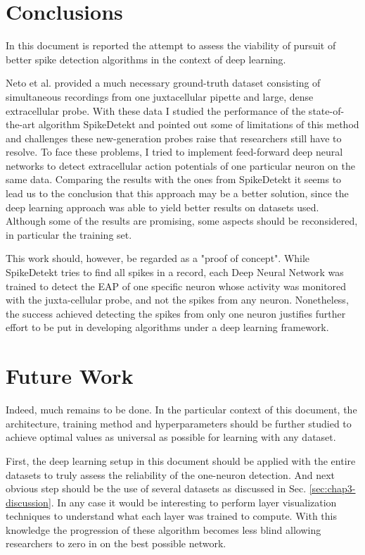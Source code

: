 \label{cap:conclusions}

\section{Conclusions}
In this document is reported the attempt to assess the viability of pursuit of better spike detection algorithms in the context of deep learning. 

Neto et al. provided a much necessary ground-truth dataset consisting of simultaneous recordings from one juxtacellular pipette and large, dense extracellular probe. With these data I studied the performance of the state-of-the-art algorithm SpikeDetekt and pointed out some of limitations of this method and challenges these new-generation probes raise that researchers still have to resolve. To face these problems, I tried to implement feed-forward deep neural networks to detect extracellular action potentials of one particular neuron on the same data. Comparing the results with the ones from SpikeDetekt it seems to lead us to the conclusion that this approach may be a better solution, since the deep learning approach was able to yield better results on datasets used. Although some of the results are promising, some aspects should be reconsidered, in particular the training set. 

This work should, however, be regarded as a "proof of concept". While SpikeDetekt tries to find all spikes in a record, each Deep Neural Network was trained to detect the EAP of one specific neuron whose activity was monitored with the juxta-cellular probe, and not the spikes from any neuron. Nonetheless, the success achieved detecting the spikes from only one neuron justifies further effort to be put in developing algorithms under a deep learning framework.


\section{Future Work}
Indeed, much remains to be done. In the particular context of this document, the architecture, training method and hyperparameters should be further studied to achieve optimal values as universal as possible for learning with any dataset.

First, the deep learning setup in this document should be applied with the entire datasets to truly assess the reliability of the one-neuron detection. And next obvious step should be the use of several datasets as discussed in Sec. \ref{sec:chap3-discussion}. In any case it would be interesting to perform layer visualization techniques to understand what each layer was trained to compute. With this knowledge the progression of these algorithm becomes less blind allowing researchers to zero in on the best possible network.

